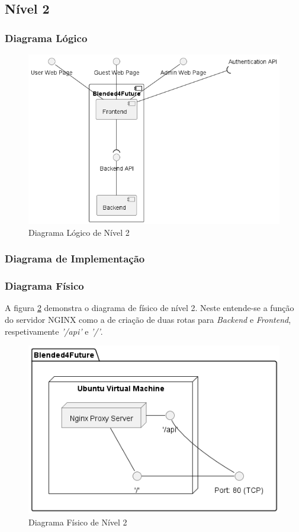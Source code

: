 \subsection{Nível 2}

\subsubsection{Diagrama Lógico}

\begin{figure}[h!tbp]
    \centering
    \includegraphics[width=0.7\linewidth]{capitulos/cap3-analisedoproblema/assets/arquiteturasistema/logical/logical_l2.png}
    \caption{Diagrama Lógico de Nível 2}
    \label{fig:diagram-lvl2-logical}
\end{figure}

\subsubsection{Diagrama de Implementação}

\subsubsection{Diagrama Físico} 

A figura \ref{fig:diagram-lvl2-physical} demonstra o diagrama de físico de nível 2. Neste entende-se a função do servidor \gls{NGINX} como a de criação de duas rotas para \textit{Backend} e \textit{Frontend}, respetivamente \textit{'/api'} e \textit{'/'}.

\begin{figure}[h!tbp]
    \centering
    \includegraphics[width=0.6\linewidth]{capitulos/cap3-analisedoproblema/assets/arquiteturasistema/physical/physical_l2.png}
    \caption{Diagrama Físico de Nível 2}
    \label{fig:diagram-lvl2-physical}
\end{figure}




